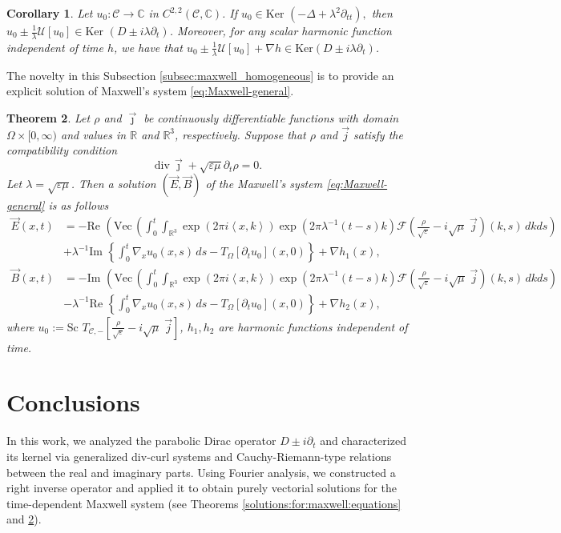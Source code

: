 \documentclass[12pt]{article}
\newtheorem{theorem}{Theorem}
\newtheorem{corollary}[theorem]{Corollary}
\def\C{\mathbb{C}}
\def\R{\mathbb{R}}
\def\Vec{\mbox{Vec}\,}
\def\div{\mbox{div}\,}
\def\C{\mathbb{C}}
\def\R{\mathbb{R}}
\def\Vec{\mbox{Vec}\,}
\let\epsilon\varepsilon
\newcommand{\inner}[1]{\left\langle #1 \right\rangle}
\newcommand{\fourier}[1]{\mathcal{F}\left( #1 \right)}
\newcommand{\expo}[1]{\exp\left( #1\right)}
\newcommand{\Twm}[1]{T_{\mathscr{C},-}\left[ #1\right]}
\begin{document}
\begin{corollary}
      Let $u_0:\mathscr{C}\to\C$ in $C^{2,2}(\mathscr{C},\mathbb{C})$. If $u_0\in\text{Ker }(-\Delta+\lambda^2\partial_{tt}),$ then $u_0\pm\frac{1}{\lambda}\mathscr{U}[u_0]\in\text{Ker }(D\pm i\lambda \partial_t)$. Moreover, for any scalar harmonic function independent of time $h$, we have that $u_0\pm \frac{1}{\lambda}\mathscr{U}[u_0]+\nabla h\in\text{Ker}(D\pm i\lambda \partial_t)$.  
\end{corollary}

The novelty in this Subsection \ref{subsec:maxwell_homogeneous} is to provide an explicit solution of Maxwell's system \eqref{eq:Maxwell-general}.


\begin{theorem}\label{th:general}
 Let $\rho$ and $\vec\jmath$ be continuously differentiable functions with domain $\Omega\times[0,\infty)$ and values in $\R$ and $\R^3$, respectively. Suppose that $\rho$ and $\vec j$ satisfy the compatibility condition 
\begin{equation}
        \div\vec\jmath+\sqrt{\epsilon\mu}\partial_t\rho=0.
\end{equation}
Let $\lambda=\sqrt{\epsilon\mu}$. Then a solution $(\vec E, \vec B)$ of the Maxwell's system \eqref{eq:Maxwell-general} is as follows
       \begin{align*}
        \vec E(x,t)&=-\text{Re }\left(\Vec\left(\int_0^t\int_{\R^3}\expo{2\pi i\inner{x,k}}\expo{2\pi\lambda^{-1}(t-s)k}\fourier{\frac{\rho}{\sqrt{\epsilon}}-i\sqrt{\mu}\;\vec j}(k,s)\, dkds\right)\right.\\
        &+\lambda^{-1}\text{Im }\left\{\int_0^t \nabla_{x} u_0(x,s)\, ds-T_\Omega[\partial_t u_0](x,0) \right\}+\nabla h_1(x),
    \end{align*}
    \begin{align*}
        \vec B(x,t)&=-\text{Im }\left(\Vec\left(\int_0^t\int_{\R^3}\expo{2\pi i\inner{x,k}}\expo{2\pi\lambda^{-1}(t-s)k}\fourier{\frac{\rho}{\sqrt{\epsilon}}-i\sqrt{\mu}\;\vec j}(k,s)\,dkds\right)\right.\\
        &-\lambda^{-1}\text{Re }\left\{\int_0^t \nabla _x u_0(x,s)\, ds-T_\Omega[\partial_t u_0](x,0)\right\}+\nabla h_2(x),
    \end{align*}
where $u_0:=\text{Sc }\Twm{\frac{\rho}{\sqrt{\epsilon}}-i\sqrt{\mu}\;\vec j}$, $h_1, h_2$ are harmonic functions independent of time.
\end{theorem}

\section{Conclusions}
In this work, we analyzed the parabolic Dirac operator $D \pm i\partial_t$ and characterized its kernel via generalized div-curl systems and Cauchy-Riemann-type relations between the real and imaginary parts. Using Fourier analysis, we constructed a right inverse operator and applied it to obtain purely vectorial solutions for the time-dependent Maxwell system (see Theorems \ref{solutions:for:maxwell:equations} and \ref{th:general}).
\end{document}
